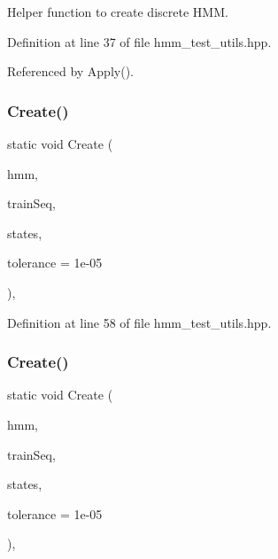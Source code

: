 Helper function to create discrete H\+MM. 



Definition at line 37 of file hmm\+\_\+test\+\_\+utils.\+hpp.



Referenced by Apply().

\mbox{\label{structInitHMMModel_ada660c2630ff663ac9002121e1e28b5e}} 
\subsubsection{Create()\hspace{0.1cm}{\footnotesize\ttfamily [2/4]}}
{\footnotesize\ttfamily static void Create (\begin{DoxyParamCaption}\item[{H\+MM$<$ Gaussian\+Distribution $>$ \&}]{hmm,  }\item[{vector$<$ mat $>$ \&}]{train\+Seq,  }\item[{size\+\_\+t}]{states,  }\item[{double}]{tolerance = {\ttfamily 1e-\/05} }\end{DoxyParamCaption})\hspace{0.3cm}{\ttfamily [inline]}, {\ttfamily [static]}}



Definition at line 58 of file hmm\+\_\+test\+\_\+utils.\+hpp.

\mbox{\label{structInitHMMModel_ad22d3a4f18404743629ee3157b071f90}} 
\subsubsection{Create()\hspace{0.1cm}{\footnotesize\ttfamily [3/4]}}
{\footnotesize\ttfamily static void Create (\begin{DoxyParamCaption}\item[{H\+MM$<$ G\+MM $>$ \&}]{hmm,  }\item[{vector$<$ mat $>$ \&}]{train\+Seq,  }\item[{size\+\_\+t}]{states,  }\item[{double}]{tolerance = {\ttfamily 1e-\/05} }\end{DoxyParamCaption})\hspace{0.3cm}{\ttfamily [inline]}, {\ttfamily [static]}}



